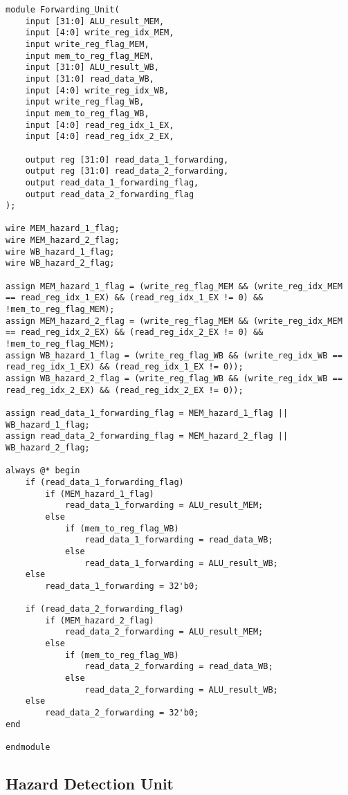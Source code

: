 \documentclass[a4paper,12pt]{article}
\begin{document}
\begin{verbatim}
module Forwarding_Unit(
    input [31:0] ALU_result_MEM,
    input [4:0] write_reg_idx_MEM,
    input write_reg_flag_MEM,
    input mem_to_reg_flag_MEM,
    input [31:0] ALU_result_WB,
    input [31:0] read_data_WB,
    input [4:0] write_reg_idx_WB,
    input write_reg_flag_WB,
    input mem_to_reg_flag_WB,
    input [4:0] read_reg_idx_1_EX,
    input [4:0] read_reg_idx_2_EX,

    output reg [31:0] read_data_1_forwarding,
    output reg [31:0] read_data_2_forwarding,
    output read_data_1_forwarding_flag,
    output read_data_2_forwarding_flag
);

wire MEM_hazard_1_flag;
wire MEM_hazard_2_flag;
wire WB_hazard_1_flag;
wire WB_hazard_2_flag;

assign MEM_hazard_1_flag = (write_reg_flag_MEM && (write_reg_idx_MEM == read_reg_idx_1_EX) && (read_reg_idx_1_EX != 0) && !mem_to_reg_flag_MEM);
assign MEM_hazard_2_flag = (write_reg_flag_MEM && (write_reg_idx_MEM == read_reg_idx_2_EX) && (read_reg_idx_2_EX != 0) && !mem_to_reg_flag_MEM);
assign WB_hazard_1_flag = (write_reg_flag_WB && (write_reg_idx_WB == read_reg_idx_1_EX) && (read_reg_idx_1_EX != 0));
assign WB_hazard_2_flag = (write_reg_flag_WB && (write_reg_idx_WB == read_reg_idx_2_EX) && (read_reg_idx_2_EX != 0));

assign read_data_1_forwarding_flag = MEM_hazard_1_flag || WB_hazard_1_flag;
assign read_data_2_forwarding_flag = MEM_hazard_2_flag || WB_hazard_2_flag;

always @* begin
    if (read_data_1_forwarding_flag)
        if (MEM_hazard_1_flag)
            read_data_1_forwarding = ALU_result_MEM;
        else
            if (mem_to_reg_flag_WB)
                read_data_1_forwarding = read_data_WB;
            else
                read_data_1_forwarding = ALU_result_WB;
    else
        read_data_1_forwarding = 32'b0;

    if (read_data_2_forwarding_flag)
        if (MEM_hazard_2_flag)
            read_data_2_forwarding = ALU_result_MEM;
        else
            if (mem_to_reg_flag_WB)
                read_data_2_forwarding = read_data_WB;
            else
                read_data_2_forwarding = ALU_result_WB;
    else
        read_data_2_forwarding = 32'b0;
end

endmodule
\end{verbatim}

\subsection{Hazard Detection Unit}
\end{document}
